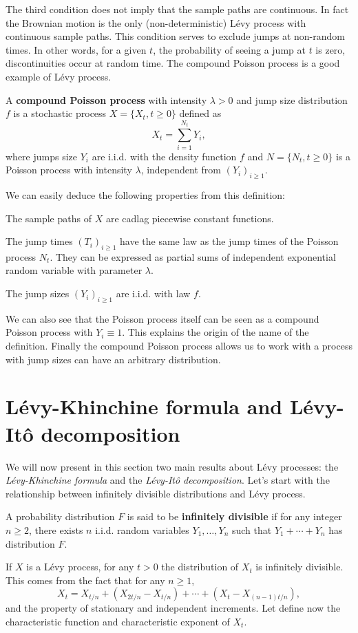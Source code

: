 The third condition does not imply that the sample paths are continuous. In fact the Brownian motion is the only (non-deterministic) L\'evy process with continuous sample paths. This condition serves to exclude jumps at non-random times. In other words, for a given $t$, the probability of seeing a jump at $t$ is zero, discontinuities occur at random time. The compound Poisson process is a good example of L\'evy process.

\begin{defn}
A \textbf{compound Poisson process} with intensity $\lambda > 0$ and jump size distribution $f$ is a stochastic process $X=\{X_t,t\geq 0\}$ defined as 
$$X_t = \sum_{i=1}^{N_t}Y_i,$$
where jumps size $Y_i$ are i.i.d. with the density function $f$ and $N=\{N_t,t\geq 0\}$ is a Poisson process with intensity $\lambda$, independent from $(Y_i)_{i\geq 1}$.
\end{defn}
We can easily deduce the following properties from this definition:
\begin{my_list_num}
\item The sample paths of $X$ are cadlag piecewise constant functions.
\item The jump times $(T_i)_{i\geq 1}$ have the same law as the jump times of the Poisson process $N_t$. They can be expressed as partial sums of independent exponential random variable with parameter $\lambda$.
\item The jump sizes $(Y_i)_{i\geq1}$ are i.i.d. with law $f$.
\end{my_list_num}
We can also see that the Poisson process itself can be seen as a compound Poisson process with $Y_i \equiv 1$. This explains the origin of the name of the definition. Finally the compound Poisson process allows us to work with a process with jump sizes can have an arbitrary distribution.

\section{L\'evy-Khinchine formula and L\'evy-Itô decomposition}
\label{sec:Levy:theorems}
We will now present in this section two main results about L\'evy processes: the \textit{L\'evy-Khinchine formula} and the \textit{L\'evy-Itô decomposition}. Let's start with the relationship between infinitely divisible distributions and L\'evy process.

\begin{defn}
A probability distribution $F$ is said to be \textbf{infinitely divisible} if for any integer $n\geq 2$, there exists $n$ i.i.d. random variables $Y_1,\ldots,Y_n$ such that $Y_1+\cdots+Y_n$ has distribution $F$.
\end{defn}
If $X$ is a L\'evy process, for any $t>0$ the distribution of $X_t$ is infinitely divisible. This comes from the fact that for any $n \geq 1$,
\begin{equation}\label{eq:inf-div}
X_t = X_{t/n} + (X_{2t/n}-X_{t/n}) + \cdots + (X_t - X_{(n-1)t/n}),
\end{equation}
and the property of stationary and independent increments. Let define now the characteristic function and characteristic  exponent of $X_t$.


